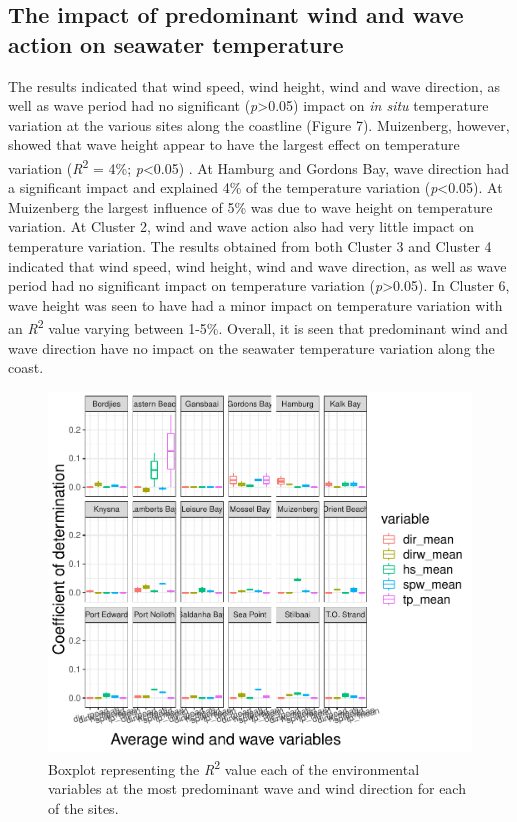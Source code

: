 \documentclass[12pt,a4paper,]{article}
\begin{document}
\hypertarget{the-impact-of-predominant-wind-and-wave-action-on-seawater-temperature}{%
\subsection{The impact of predominant wind and wave action on seawater
temperature}\label{the-impact-of-predominant-wind-and-wave-action-on-seawater-temperature}}

The results indicated that wind speed, wind height, wind and wave
direction, as well as wave period had no significant
(\emph{p}\textgreater{}0.05) impact on \emph{in situ} temperature
variation at the various sites along the coastline (Figure 7).
Muizenberg, however, showed that wave height appear to have the largest
effect on temperature variation (\emph{R}\textsuperscript{2} = 4\%;
\emph{p}\textless{}0.05) . At Hamburg and Gordons Bay, wave direction
had a significant impact and explained 4\% of the temperature variation
(\emph{p}\textless{}0.05). At Muizenberg the largest influence of 5\%
was due to wave height on temperature variation. At Cluster 2, wind and
wave action also had very little impact on temperature variation. The
results obtained from both Cluster 3 and Cluster 4 indicated that wind
speed, wind height, wind and wave direction, as well as wave period had
no significant impact on temperature variation
(\emph{p}\textgreater{}0.05). In Cluster 6, wave height was seen to have
had a minor impact on temperature variation with an
\emph{R}\textsuperscript{2} value varying between 1-5\%. Overall, it is
seen that predominant wind and wave direction have no impact on the
seawater temperature variation along the coast.

\begin{figure}
\centering
\includegraphics{../figures/predominant_ww.pdf}
\caption{Boxplot representing the \emph{R}\textsuperscript{2} value each
of the environmental variables at the most predominant wave and wind
direction for each of the sites.}
\end{figure}
\end{document}
